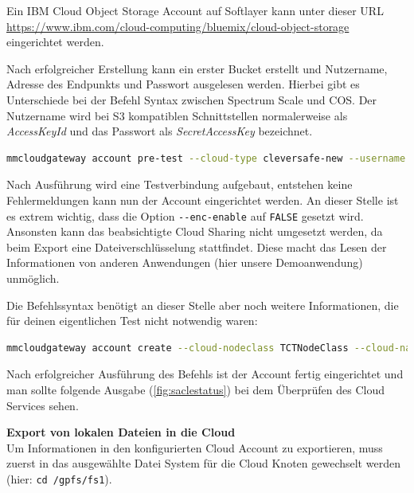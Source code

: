 Ein IBM Cloud Object Storage Account auf Softlayer kann unter dieser URL \url{https://www.ibm.com/cloud-computing/bluemix/cloud-object-storage} eingerichtet werden. 

Nach erfolgreicher Erstellung kann ein erster Bucket erstellt und Nutzername, Adresse des Endpunkts und Passwort ausgelesen werden. Hierbei gibt es Unterschiede bei der Befehl Syntax zwischen Spectrum Scale und \ac{COS}. 
Der Nutzername wird bei S3 kompatiblen Schnittstellen normalerweise als \textit{AccessKeyId} und das Passwort als \textit{SecretAccessKey} bezeichnet.\\

\begin{lstlisting}[language=bash, caption=Vortest des Cloud Sharing Accounts]
mmcloudgateway account pre-test --cloud-type cleversafe-new --username "<username>" --pwd-file <path/file/your/secretAccessKey> --cloud-url <cos/endpoint>
\end{lstlisting}

Nach Ausführung wird eine Testverbindung aufgebaut, entstehen keine Fehlermeldungen kann nun der Account eingerichtet werden. An dieser Stelle ist es extrem wichtig, dass die Option \lstinline|--enc-enable| auf \lstinline|FALSE| gesetzt wird. Ansonsten kann das beabsichtigte Cloud Sharing nicht umgesetzt werden, da beim Export eine Dateiverschlüsselung stattfindet. Diese macht das Lesen der Informationen von anderen Anwendungen (hier unsere Demoanwendung) unmöglich.

Die Befehlssyntax benötigt an dieser Stelle aber noch weitere Informationen, die für deinen eigentlichen Test nicht notwendig waren:\\

\begin{lstlisting}[language=bash, caption=Einrichtung des Cloud Sharing Accounts]
mmcloudgateway account create --cloud-nodeclass TCTNodeClass --cloud-name mcstore --cloud-type cleversafe-new --username "<username>" --pwd-file <path/file/your/secretAccessKey> --enable TRUE --cloud-url <cos/endpoint> --enc-enable FALSE
\end{lstlisting}

Nach erfolgreicher Ausführung des Befehls ist der Account fertig eingerichtet und man sollte folgende Ausgabe (\autoref{fig:saclestatus}) bei dem Überprüfen des Cloud Services sehen.

\textbf{Export von lokalen Dateien in die Cloud}\\
Um Informationen in den konfigurierten Cloud Account zu exportieren, muss zuerst in das ausgewählte Datei System für die Cloud Knoten gewechselt werden (hier: \lstinline|cd /gpfs/fs1|).

